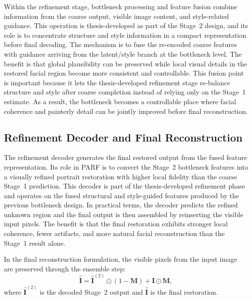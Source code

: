 \documentclass[12pt, twoside]{report}
\begin{document}
Within the refinement stage, bottleneck processing and feature fusion combine information from the coarse output, visible image content, and style-related guidance. This operation is thesis-developed as part of the Stage~2 design, and its role is to concentrate structure and style information in a compact representation before final decoding. The mechanism is to fuse the re-encoded coarse features with guidance arriving from the latent/style branch at the bottleneck level. The benefit is that global plausibility can be preserved while local visual details in the restored facial region become more consistent and controllable.
This fusion point is important because it lets the thesis-developed refinement stage re-balance structure and style after coarse completion instead of relying only on the Stage~1 estimate. As a result, the bottleneck becomes a controllable place where facial coherence and painterly detail can be jointly improved before final reconstruction.

\subsection{Refinement Decoder and Final Reconstruction}

The refinement decoder generates the final restored output from the fused feature representation. Its role in PARF is to convert the Stage~2 bottleneck features into a visually refined portrait restoration with higher local fidelity than the coarse Stage~1 prediction. This decoder is part of the thesis-developed refinement phase and operates on the fused structural and style-guided features produced by the previous bottleneck design. In practical terms, the decoder predicts the refined unknown region and the final output is then assembled by reinserting the visible input pixels. The benefit is that the final restoration exhibits stronger local coherence, fewer artifacts, and more natural facial reconstruction than the Stage~1 result alone.

In the final reconstruction formulation, the visible pixels from the input image are preserved through the ensemble step:
\begin{equation}
\hat{\mathbf{I}} = \hat{\mathbf{I}}^{(2)} \odot (1-\mathbf{M}) + \mathbf{I} \odot \mathbf{M},
\end{equation}
where $\hat{\mathbf{I}}^{(2)}$ is the decoded Stage~2 output and $\hat{\mathbf{I}}$ is the final restoration.
\end{document}
